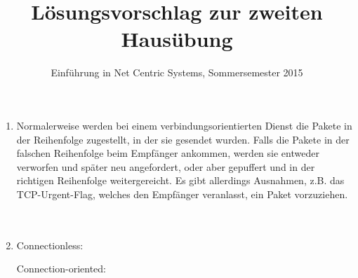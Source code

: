 \documentclass[a4paper,
			llpt,
			solution,
			accentcolor=tud2d,
			colorbacktitle
			]
			{tudexercise}
\title{Lösungsvorschlag zur zweiten Hausübung}
\subtitle{Einführung in Net Centric Systems, Sommersemester 2015}
\begin{document}
\maketitle
\section{}


\begin{multicols}{2}
\begin{enumerate}

\item
Normalerweise werden bei einem verbindungsorientierten Dienst die Pakete in der Reihenfolge zugestellt, in der sie gesendet wurden. Falls die Pakete in der falschen Reihenfolge beim Empfänger ankommen, werden sie entweder verworfen und später neu angefordert, oder aber gepuffert und in der richtigen Reihenfolge weitergereicht.
Es gibt allerdings Ausnahmen, z.B. das TCP-Urgent-Flag, welches den Empfänger veranlasst, ein Paket vorzuziehen.
\\\\\\
\item
Connectionless:
Connection-oriented:
\end{enumerate}
\end{multicols}
\section{}
\end{document}
